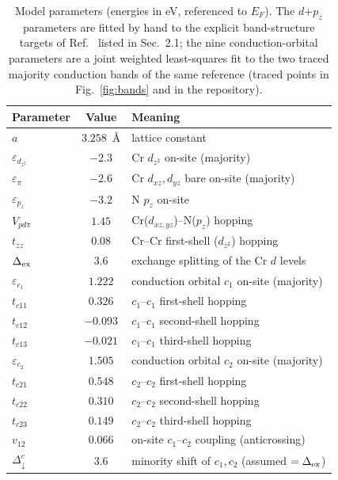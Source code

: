 \documentclass[preprint,12pt]{elsarticle}
\begin{document}
\begin{table}[t]
\centering
\caption{Model parameters (energies in eV, referenced to $E_F$). The $d$+$p_z$ parameters are
fitted by hand to the explicit band-structure targets of Ref.~\cite{Kuklin2017} listed in
Sec.~2.1; the nine conduction-orbital parameters are a joint weighted least-squares fit to the
two traced majority conduction bands of the same reference (traced points in
Fig.~\ref{fig:bands} and in the repository).}
\label{tab:params}
\begin{tabular}{lcl}
\toprule
Parameter & Value & Meaning \\
\midrule
$a$ & $3.258$~\AA & lattice constant \\
$\varepsilon_{d_{z^2}}$ & $-2.3$ & Cr $d_{z^2}$ on-site (majority) \\
$\varepsilon_{\pi}$ & $-2.6$ & Cr $d_{xz},d_{yz}$ bare on-site (majority) \\
$\varepsilon_{p_z}$ & $-3.2$ & N $p_z$ on-site \\
$V_{pd\pi}$ & $1.45$ & Cr($d_{xz,yz}$)--N($p_z$) hopping \\
$t_{zz}$ & $0.08$ & Cr--Cr first-shell ($d_{z^2}$) hopping \\
$\Delta_{\rm ex}$ & $3.6$ & exchange splitting of the Cr $d$ levels \\
$\varepsilon_{c_1}$ & $1.222$ & conduction orbital $c_1$ on-site (majority) \\
$t_{c11}$ & $0.326$ & $c_1$--$c_1$ first-shell hopping \\
$t_{c12}$ & $-0.093$ & $c_1$--$c_1$ second-shell hopping \\
$t_{c13}$ & $-0.021$ & $c_1$--$c_1$ third-shell hopping \\
$\varepsilon_{c_2}$ & $1.505$ & conduction orbital $c_2$ on-site (majority) \\
$t_{c21}$ & $0.548$ & $c_2$--$c_2$ first-shell hopping \\
$t_{c22}$ & $0.310$ & $c_2$--$c_2$ second-shell hopping \\
$t_{c23}$ & $0.149$ & $c_2$--$c_2$ third-shell hopping \\
$v_{12}$ & $0.066$ & on-site $c_1$--$c_2$ coupling (anticrossing) \\
$\Delta^c_{\downarrow}$ & $3.6$ & minority shift of $c_1,c_2$ (assumed $=\Delta_{\rm ex}$) \\
\bottomrule
\end{tabular}
\end{table}
\end{document}
